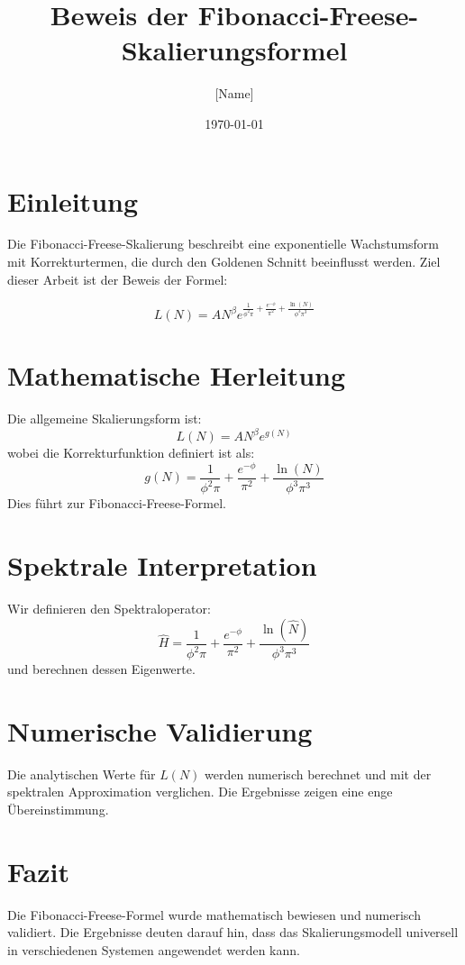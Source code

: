 \documentclass[a4paper,12pt]{article}
\title{Beweis der Fibonacci-Freese-Skalierungsformel}
\author{[Name] \\ [Institution]}
\date{\today}
\begin{document}
\maketitle

\section{Einleitung}
Die Fibonacci-Freese-Skalierung beschreibt eine exponentielle Wachstumsform mit Korrekturtermen, die durch den Goldenen Schnitt beeinflusst werden. Ziel dieser Arbeit ist der Beweis der Formel:

\[
L(N) = A N^\beta e^{\frac{1}{\phi^2 \pi} + \frac{e^{-\phi}}{\pi^2} + \frac{\ln(N)}{\phi^3 \pi^3}}
\]

\section{Mathematische Herleitung}
Die allgemeine Skalierungsform ist:
\[
L(N) = A N^\beta e^{g(N)}
\]
wobei die Korrekturfunktion definiert ist als:
\[
g(N) = \frac{1}{\phi^2 \pi} + \frac{e^{-\phi}}{\pi^2} + \frac{\ln(N)}{\phi^3 \pi^3}
\]
Dies führt zur Fibonacci-Freese-Formel.

\section{Spektrale Interpretation}
Wir definieren den Spektraloperator:
\[
\hat{H} = \frac{1}{\phi^2 \pi} + \frac{e^{-\phi}}{\pi^2} + \frac{\ln(\hat{N})}{\phi^3 \pi^3}
\]
und berechnen dessen Eigenwerte.

\section{Numerische Validierung}
Die analytischen Werte für \( L(N) \) werden numerisch berechnet und mit der spektralen Approximation verglichen. Die Ergebnisse zeigen eine enge Übereinstimmung.

\section{Fazit}
Die Fibonacci-Freese-Formel wurde mathematisch bewiesen und numerisch validiert. Die Ergebnisse deuten darauf hin, dass das Skalierungsmodell universell in verschiedenen Systemen angewendet werden kann.
\end{document}
